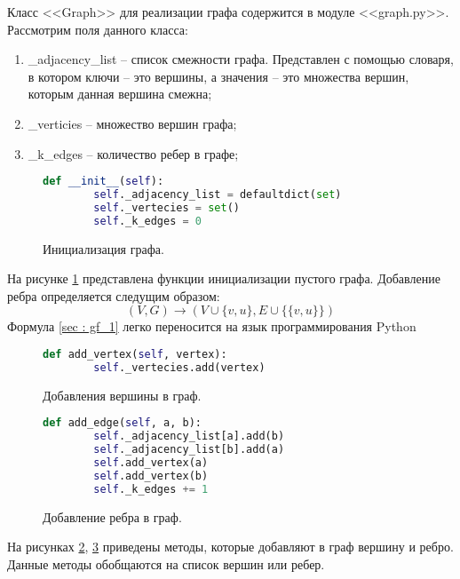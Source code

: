 Класс <<Graph>> для реализации графа содержится в модуле <<graph.py>>.
Рассмотрим поля данного класса:
\begin{enumerate}
    \item \_adjacency\_list -- список смежности графа. Представлен с
        помощью словаря, в котором ключи -- это вершины,
        а значения -- это множества вершин, которым данная вершина смежна;
    \item \_verticies -- множество вершин графа;
    \item \_k\_edges -- количество ребер в графе;
\end{enumerate}
\begin{figure}[H] 
\begin{lstlisting}[language=Python] 
    def __init__(self):
        self._adjacency_list = defaultdict(set)
        self._vertecies = set()
        self._k_edges = 0
\end{lstlisting}  
    \caption{Инициализация графа.}
    \label{sec:initgraph}
\end{figure} 
На рисунке \ref{sec:initgraph} представлена функции 
инициализации пустого графа.
Добавление ребра определяется следущим образом:
\begin{equation}
    (V,G) \to (V \cup \{v,u\}, E \cup \{\{v,u\}\})
    \label{sec : gf_1}
\end{equation} 
Формула \ref{sec : gf_1} легко переносится
на язык программирования Python
\begin{figure}[H] 
\begin{lstlisting}[language=Python] 
    def add_vertex(self, vertex):
        self._vertecies.add(vertex)
\end{lstlisting}  
    \caption{Добавления вершины в граф.}
    \label{sec:add_1}
\end{figure} 
\begin{figure}[H] 
\begin{lstlisting}[language=Python] 
    def add_edge(self, a, b):
        self._adjacency_list[a].add(b)
        self._adjacency_list[b].add(a)
        self.add_vertex(a)
        self.add_vertex(b)
        self._k_edges += 1
\end{lstlisting}  
    \caption{Добавление ребра в граф.}
    \label{sec:add_2}
\end{figure} 
На рисунках \ref{sec:add_1}, \ref{sec:add_2}
приведены методы, которые добавляют в граф вершину и ребро.
Данные методы обобщаются на список вершин или ребер.
